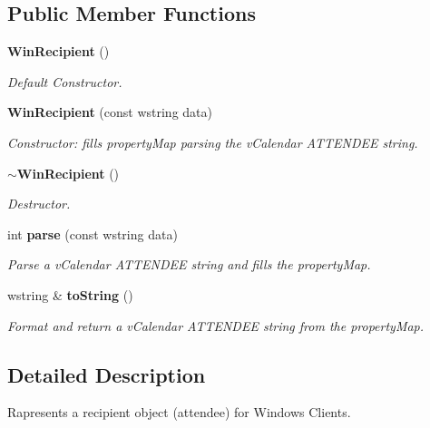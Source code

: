 \subsection*{Public Member Functions}
\begin{CompactItemize}
\item 
{\bf Win\-Recipient} ()\label{classWinRecipient_91e4ac03928c2bb6704a23bb4b77bac5}

\begin{CompactList}\small\item\em Default Constructor. \item\end{CompactList}\item 
{\bf Win\-Recipient} (const wstring data)\label{classWinRecipient_d04840e32917a6ea91ed7152d482bf71}

\begin{CompactList}\small\item\em Constructor: fills property\-Map parsing the v\-Calendar ATTENDEE string. \item\end{CompactList}\item 
{\bf $\sim$Win\-Recipient} ()\label{classWinRecipient_456cdfaaf10192366be100bcf5497bce}

\begin{CompactList}\small\item\em Destructor. \item\end{CompactList}\item 
int {\bf parse} (const wstring data)\label{classWinRecipient_6b767fda8dcac791df9dae56f924df72}

\begin{CompactList}\small\item\em Parse a v\-Calendar ATTENDEE string and fills the property\-Map. \item\end{CompactList}\item 
wstring \& {\bf to\-String} ()\label{classWinRecipient_cdfa5bd5ca2239fc185526b4eb326d62}

\begin{CompactList}\small\item\em Format and return a v\-Calendar ATTENDEE string from the property\-Map. \item\end{CompactList}\end{CompactItemize}


\subsection{Detailed Description}
Rapresents a recipient object (attendee) for Windows Clients. 

